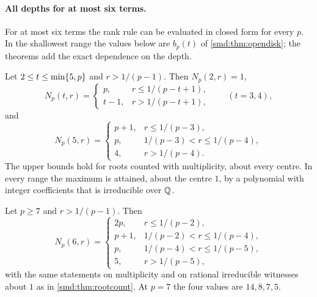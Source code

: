 \paragraph{All depths for at most six terms.}
For at most six terms the rank rule can be evaluated in closed form for every $p$. In the
shallowest range the values below are $b_p(t)$ of \cref{smd:thm:opendisk}; the theorems
add the exact dependence on the depth.

\begin{theorem}\label{smd:thm:rootcount}
Let $2\le t\le\min\{5,p\}$ and $r>1/(p-1)$. Then $N_p(2,r)=1$,
\[
 N_p(t,r)=\begin{cases}p,& r\le1/(p-t+1),\\ t-1,& r>1/(p-t+1),\end{cases}\qquad(t=3,4),
\]
and
\[
 N_p(5,r)=\begin{cases}p+1,& r\le1/(p-3),\\ p,& 1/(p-3)<r\le1/(p-4),\\ 4,& r>1/(p-4).\end{cases}
\]
The upper bounds hold for roots counted with multiplicity, about every centre. In every
range the maximum is attained, about the centre $1$, by a polynomial with integer
coefficients that is irreducible over $\mathbb{Q}$.
\end{theorem}

\begin{theorem}\label{smd:thm:sixroot}
Let $p\ge7$ and $r>1/(p-1)$. Then
\[
 N_p(6,r)=\begin{cases}
 2p,& r\le1/(p-2),\\
 p+1,& 1/(p-2)<r\le1/(p-4),\\
 p,& 1/(p-4)<r\le1/(p-5),\\
 5,& r>1/(p-5),
 \end{cases}
\]
with the same statements on multiplicity and on rational irreducible witnesses about $1$
as in \cref{smd:thm:rootcount}. At $p=7$ the four values are $14,8,7,5$.
\end{theorem}


